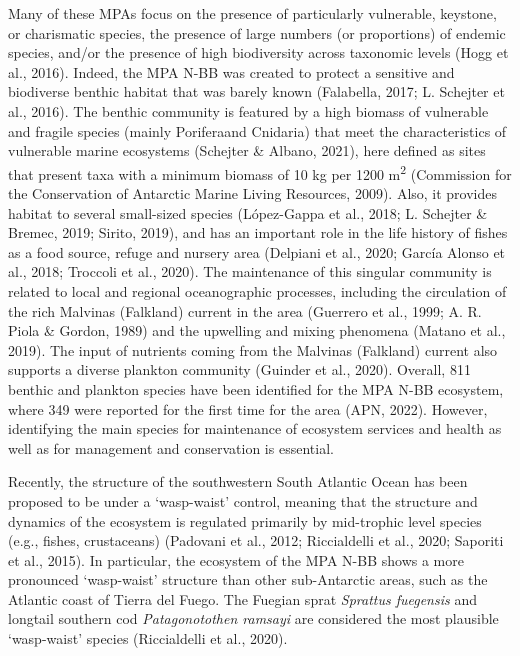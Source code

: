 \documentclass[preprint, 3p,
authoryear]{elsarticle} %
\begin{document}
Many of these MPAs focus on the presence of particularly vulnerable,
keystone, or charismatic species, the presence of large numbers (or
proportions) of endemic species, and/or the presence of high
biodiversity across taxonomic levels (Hogg et al., 2016). Indeed, the
MPA N-BB was created to protect a sensitive and biodiverse benthic
habitat that was barely known (Falabella, 2017; L. Schejter et al.,
2016). The benthic community is featured by a high biomass of vulnerable
and fragile species (mainly Poriferaand Cnidaria) that meet the
characteristics of vulnerable marine ecosystems (Schejter \& Albano,
2021), here defined as sites that present taxa with a minimum biomass of
10 kg per 1200 m\textsuperscript{2} (Commission for the Conservation of
Antarctic Marine Living Resources, 2009). Also, it provides habitat to
several small-sized species (López-Gappa et al., 2018; L. Schejter \&
Bremec, 2019; Sirito, 2019), and has an important role in the life
history of fishes as a food source, refuge and nursery area (Delpiani et
al., 2020; García Alonso et al., 2018; Troccoli et al., 2020). The
maintenance of this singular community is related to local and regional
oceanographic processes, including the circulation of the rich Malvinas
(Falkland) current in the area (Guerrero et al., 1999; A. R. Piola \&
Gordon, 1989) and the upwelling and mixing phenomena (Matano et al.,
2019). The input of nutrients coming from the Malvinas (Falkland)
current also supports a diverse plankton community (Guinder et al.,
2020). Overall, 811 benthic and plankton species have been identified
for the MPA N-BB ecosystem, where 349 were reported for the first time
for the area (APN, 2022). However, identifying the main species for
maintenance of ecosystem services and health as well as for management
and conservation is essential.

Recently, the structure of the southwestern South Atlantic Ocean has
been proposed to be under a `wasp-waist' control, meaning that the
structure and dynamics of the ecosystem is regulated primarily by
mid-trophic level species (e.g., fishes, crustaceans) (Padovani et al.,
2012; Riccialdelli et al., 2020; Saporiti et al., 2015). In particular,
the ecosystem of the MPA N-BB shows a more pronounced `wasp-waist'
structure than other sub-Antarctic areas, such as the Atlantic coast of
Tierra del Fuego. The Fuegian sprat \emph{Sprattus fuegensis} and
longtail southern cod \emph{Patagonotothen ramsayi} are considered the
most plausible `wasp-waist' species (Riccialdelli et al., 2020).
\end{document}
